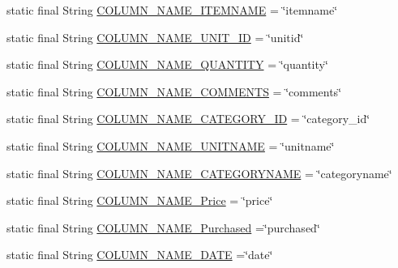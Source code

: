 \begin{DoxyCompactItemize}
\item 
static final String \hyperlink{classcom_1_1example_1_1santh_1_1shoppinglist_1_1_data_base_manager_a9b6b0327269905ec57c1be48ed26d5ce}{C\+O\+L\+U\+M\+N\+\_\+\+N\+A\+M\+E\+\_\+\+I\+T\+E\+M\+N\+A\+ME} = \char`\"{}itemname\char`\"{}
\item 
static final String \hyperlink{classcom_1_1example_1_1santh_1_1shoppinglist_1_1_data_base_manager_af428b95655be5d8e1f16a976277407ad}{C\+O\+L\+U\+M\+N\+\_\+\+N\+A\+M\+E\+\_\+\+U\+N\+I\+T\+\_\+\+ID} = \char`\"{}unitid\char`\"{}
\item 
static final String \hyperlink{classcom_1_1example_1_1santh_1_1shoppinglist_1_1_data_base_manager_ac7cedd9d2e7b05b06ca415d92c95ed44}{C\+O\+L\+U\+M\+N\+\_\+\+N\+A\+M\+E\+\_\+\+Q\+U\+A\+N\+T\+I\+TY} = \char`\"{}quantity\char`\"{}
\item 
static final String \hyperlink{classcom_1_1example_1_1santh_1_1shoppinglist_1_1_data_base_manager_a4cc6778021432214d608946fa372692d}{C\+O\+L\+U\+M\+N\+\_\+\+N\+A\+M\+E\+\_\+\+C\+O\+M\+M\+E\+N\+TS} = \char`\"{}comments\char`\"{}
\item 
static final String \hyperlink{classcom_1_1example_1_1santh_1_1shoppinglist_1_1_data_base_manager_a4fb5be00264c2cfd95471bfcbf4622dd}{C\+O\+L\+U\+M\+N\+\_\+\+N\+A\+M\+E\+\_\+\+C\+A\+T\+E\+G\+O\+R\+Y\+\_\+\+ID} = \char`\"{}category\+\_\+id\char`\"{}
\item 
static final String \hyperlink{classcom_1_1example_1_1santh_1_1shoppinglist_1_1_data_base_manager_a9f0c4da11beb1c950b1ebb5f36508409}{C\+O\+L\+U\+M\+N\+\_\+\+N\+A\+M\+E\+\_\+\+U\+N\+I\+T\+N\+A\+ME} = \char`\"{}unitname\char`\"{}
\item 
static final String \hyperlink{classcom_1_1example_1_1santh_1_1shoppinglist_1_1_data_base_manager_a4f556bf24057f251709c76b4b7c57459}{C\+O\+L\+U\+M\+N\+\_\+\+N\+A\+M\+E\+\_\+\+C\+A\+T\+E\+G\+O\+R\+Y\+N\+A\+ME} = \char`\"{}categoryname\char`\"{}
\item 
static final String \hyperlink{classcom_1_1example_1_1santh_1_1shoppinglist_1_1_data_base_manager_a9f3ac8fb53568e965aee644e520989c8}{C\+O\+L\+U\+M\+N\+\_\+\+N\+A\+M\+E\+\_\+\+Price} = \char`\"{}price\char`\"{}
\item 
static final String \hyperlink{classcom_1_1example_1_1santh_1_1shoppinglist_1_1_data_base_manager_ae885ba4bb592938e34c718f282743384}{C\+O\+L\+U\+M\+N\+\_\+\+N\+A\+M\+E\+\_\+\+Purchased} =\char`\"{}purchased\char`\"{}
\item 
static final String \hyperlink{classcom_1_1example_1_1santh_1_1shoppinglist_1_1_data_base_manager_a50114b228e86c9deec8918f193faf6f0}{C\+O\+L\+U\+M\+N\+\_\+\+N\+A\+M\+E\+\_\+\+D\+A\+TE} =\char`\"{}date\char`\"{}
\end{DoxyCompactItemize}


